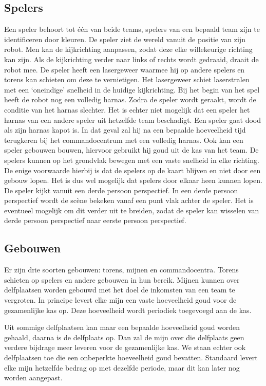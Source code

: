     \subsection{Spelers}
    Een speler behoort tot \'e\'en van beide teams, spelers van een bepaald team zijn te identificeren door kleuren. De speler ziet de wereld vanuit de positie van zijn robot. Men kan de kijkrichting aanpassen, zodat deze elke willekeurige richting kan zijn. Als de kijkrichting verder naar links of rechts wordt gedraaid, draait de robot mee. De speler heeft een lasergeweer waarmee hij op andere spelers en torens kan schieten om deze te vernietigen. Het lasergeweer schiet laserstralen met een `oneindige' snelheid in de huidige kijkrichting. Bij het begin van het spel heeft de robot nog een volledig harnas. Zodra de speler wordt geraakt, wordt de conditie van het harnas slechter. Het is echter niet mogelijk dat een speler het harnas van een andere speler uit hetzelfde team beschadigt.
    \FloatBarrier
    Een speler gaat dood als zijn harnas kapot is. In dat geval zal hij na een bepaalde hoeveelheid tijd terugkeren bij het commandocentrum met een volledig harnas. Ook kan een speler gebouwen bouwen, hiervoor gebruikt hij goud uit de kas van het team. De spelers kunnen op het grondvlak bewegen met een vaste snelheid in elke richting. De enige voorwaarde hierbij is dat de spelers op de kaart blijven en niet door een gebouw lopen. Het is dus wel mogelijk dat spelers door elkaar heen kunnen lopen. De speler kijkt vanuit een derde persoon perspectief. In een derde persoon perspectief wordt de sc\`ene bekeken vanaf een punt vlak achter de speler. Het is eventueel mogelijk om dit verder uit te breiden, zodat de speler kan wisselen van derde persoon perspectief naar eerste persoon perspectief.

    \subsection{Gebouwen}
    Er zijn drie soorten gebouwen: torens, mijnen en commandocentra. Torens schieten op spelers en andere gebouwen in hun bereik. Mijnen kunnen over delfplaatsen worden gebouwd met het doel de inkomsten van een team te vergroten. In principe levert elke mijn een vaste hoeveelheid goud voor de gezamenlijke kas op. Deze hoeveelheid wordt periodiek toegevoegd aan de kas.

    Uit sommige delfplaatsen kan maar een bepaalde hoeveelheid goud worden gehaald, daarna is de delfplaats op. Dan zal de mijn over die delfplaats geen verdere bijdrage meer leveren voor de gezamenlijke kas. We staan echter ook delfplaatsen toe die een onbeperkte hoeveelheid goud bevatten. Standaard levert elke mijn hetzelfde bedrag op met dezelfde periode, maar dit kan later nog worden aangepast.

